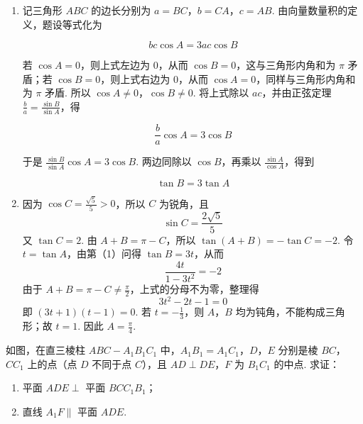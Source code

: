 \begin{solution}
\begin{enumerate}
\item 记三角形 \(ABC\) 的边长分别为 \(a=BC\)，\(b=CA\)，\(c=AB\). 由向量数量积的定义，题设等式化为

\[
bc\cos A=3ac\cos B
\]

若 \(\cos A=0\)，则上式左边为 \(0\)，从而 \(\cos B=0\)，这与三角形内角和为 \(\pi\) 矛盾；若 \(\cos B=0\)，则上式右边为 \(0\)，从而 \(\cos A=0\)，同样与三角形内角和为 \(\pi\) 矛盾. 所以 \(\cos A\neq0\)，\(\cos B\neq0\). 将上式除以 \(ac\)，并由正弦定理 \(\frac{b}{a}=\frac{\sin B}{\sin A}\)，得

\[
\frac{b}{a}\cos A=3\cos B
\]

于是 \(\frac{\sin B}{\sin A}\cos A=3\cos B\). 两边同除以 \(\cos B\)，再乘以 \(\frac{\sin A}{\cos A}\)，得到

\[
\tan B=3\tan A
\]

\item 因为 \(\cos C=\frac{\sqrt{5}}{5}>0\)，所以 \(C\) 为锐角，且
\[
\sin C=\frac{2\sqrt{5}}{5}
\]
又 \(\tan C=2\). 由 \(A+B=\pi-C\)，所以 \(\tan(A+B)=-\tan C=-2\). 令 \(t=\tan A\)，由第（1）问得 \(\tan B=3t\)，从而
\[
\frac{4t}{1-3t^2}=-2
\]
由于 \(A+B=\pi-C\neq\frac{\pi}{2}\)，上式的分母不为零，整理得
\[
3t^2-2t-1=0
\]
即 \((3t+1)(t-1)=0\). 若 \(t=-\frac{1}{3}\)，则 \(A\)，\(B\) 均为钝角，不能构成三角形；故 \(t=1\). 因此 \(A=\frac{\pi}{4}\).
\end{enumerate}
\end{solution}

\begin{problem}
如图，在直三棱柱 \(ABC-A_{1}B_{1}C_{1}\) 中，\(A_{1}B_{1}=A_{1}C_{1}\)，\(D\)，\(E\) 分别是棱 \(BC\)，\(CC_{1}\) 上的点（点 \(D\) 不同于点 \(C\)），且 \(AD \perp DE\)，\(F\) 为 \(B_{1}C_{1}\) 的中点. 求证：

\begin{enumerate}
\item 平面 \(ADE \perp\) 平面 \(BCC_{1}B_{1}\)；
\item 直线 \(A_{1}F \parallel\) 平面 \(ADE\).
\end{enumerate}
\end{problem}

